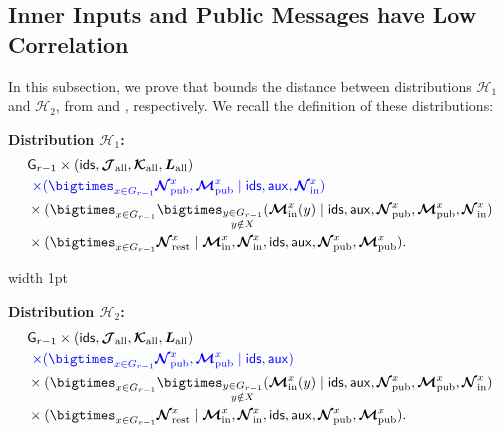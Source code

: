 \documentclass[11pt]{article}
\theoremstyle{definition}
\newcommand{\rv}[1]{\ensuremath{{\mathsf{#1}}}\xspace}
\newcommand{\rNinner}[2]{\ensuremath{\bm{\mathcal{N}}_{\textnormal{in}}^{#1_{#2}}}}
\newcommand{\cH}{\ensuremath{\mathcal{H}}}
\newcommand{\raux}{\ensuremath{\rv{aux}}}
\newcommand{\rcJall}{\ensuremath{\bm{\mathcal{J}}_{\textnormal{all}}}}
\newcommand{\rcKall}{\ensuremath{\bm{\mathcal{K}}_{\textnormal{all}}}}
\newcommand{\rLall}{\ensuremath{\bm{L}_{\textnormal{all}}}}
\newcommand{\rNpub}[1]{\ensuremath{\bm{\mathcal{N}}_{\textnormal{pub}}^{#1}}}
\newcommand{\rMpub}[1]{\ensuremath{\bm{\mathcal{M}}_{\textnormal{pub}}^{#1}}}
\newcommand{\rMinner}[1]{\ensuremath{\bm{\mathcal{M}}_{\textnormal{in}}^{#1}}}
\newcommand{\rNrest}[1]{\ensuremath{\bm{\mathcal{N}}^{#1}_{\textnormal{rest}}}}
\newcommand{\rG}{\ensuremath{\rv{G}}}
\newcommand{\rids}{\ensuremath{\rv{ids}}}
\begin{document}
\subsection{Inner Inputs and Public Messages have Low Correlation}\label{subsec:public-msgs}

In this subsection, we prove  that bounds the distance between distributions $\cH_1$ and $\cH_2$, from  and , respectively. 
We recall the definition of these distributions: 

\vspace{3mm}
\hspace{-1.5em}
\begin{minipage}{0.48\textwidth}
	\small
\textbf{Distribution $\cH_1$:}
\begin{align*}
	&\rG_{r-1} \times (\rids, \rcJall, \rcKall, \rLall)\\
	&~\eqcolor{\times (\bigtimes_{x \in G_{r-1}} \rNpub{x}, \rMpub{x} \mid \rids, \raux, \rNinner{x}{})}  \\
	&\times (\bigtimes_{x \in G_{r-1}}\bigtimes_{\substack{y \in G_{r-1} \\y \notin X}}  (\rMinner{x}(y) \mid  \rids, \raux, \rNpub{x}, \rMpub{x}, \rNinner{x}{})   \\
	&\times (\bigtimes_{x \in G_{r-1}}  \rNrest{x} \mid \rMinner{x}, \rNinner{x}{}, \rids, \raux, \rNpub{x}, \rMpub{x}). 
\end{align*}
\end{minipage}
\vrule width 1pt %
\hspace{0.5em} %
\begin{minipage}{0.48\textwidth}
	\small
	\textbf{Distribution $\cH_2$:}
\begin{align*}
	&\rG_{r-1} \times (\rids, \rcJall, \rcKall, \rLall) \\
	&~\eqcolor{\times (\bigtimes_{x \in G_{r-1}} \rNpub{x}, \rMpub{x} \mid \rids, \raux)} \\
	&\times (\bigtimes_{x \in G_{r-1}}\bigtimes_{\substack{y \in G_{r-1} \\y \notin X}} (\rMinner{x}(y) \mid  \rids, \raux, \rNpub{x}, \rMpub{x}, \rNinner{x}{})    \\
	&\times (\bigtimes_{x \in G_{r-1}}  \rNrest{x} \mid \rMinner{x}, \rNinner{x}{}, \rids, \raux, \rNpub{x}, \rMpub{x}). 
\end{align*}
\end{minipage}
\vspace{3mm}
\end{document}
